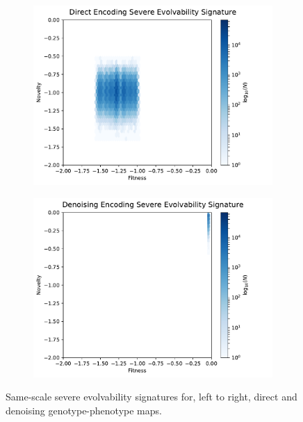 \begin{figure}
        \begin{subfigure}[b]{0.5\textwidth}
                \includegraphics[width=\linewidth]{img/direct_severe_es_scaled2}
        \end{subfigure}%
        \begin{subfigure}[b]{0.5\textwidth}
                \includegraphics[width=\linewidth]{img/noise_severe_es_scaled2}
        \end{subfigure}
        \caption{
          Same-scale severe evolvability signatures for, left to right, direct and denoising genotype-phenotype maps.
          }\label{fig:noise_severe_compare_es}
\end{figure}
